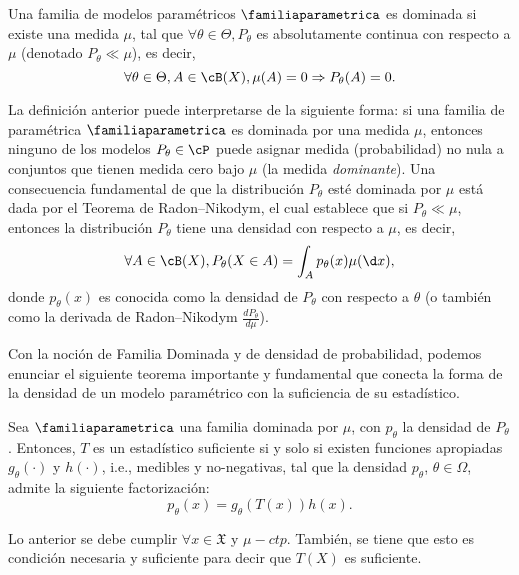 \begin{definition}
	Una familia de modelos paramétricos $\familiaparametrica$ es dominada si existe una medida $\mu$, tal que $\forall \theta\in\Theta, P_\theta$ es absolutamente continua con respecto a $\mu$ (denotado $ P_\theta \ll \mu$), es decir, 
	\begin{equation}
	\nonumber
		\forall \theta\in\Theta, A\in\cB(X), \mu(A)=0 \Rightarrow P_\theta(A) = 0.
	\end{equation}
\end{definition}

La definición anterior puede interpretarse de la siguiente forma: si una familia de paramétrica $\familiaparametrica$ es dominada por una medida $\mu$, entonces ninguno de los modelos $P_\theta\in\cP$ puede asignar medida (probabilidad) no nula a conjuntos que tienen medida cero bajo $\mu$ (la medida \textit{dominante}). Una consecuencia fundamental de que la distribución $P_\theta$ esté dominada por $\mu$ está dada por el Teorema de Radon–Nikodym,  el cual establece que si $ P_\theta \ll \mu$, entonces la distribución $P_\theta$ tiene una densidad con respecto a $\mu$, es decir,	
	\begin{equation}
	\nonumber
		\forall A\in\cB(X), P_\theta(X\in A) = \int _A p_\theta(x) \mu(\d x),
	\end{equation}
donde $p_\theta(x)$ es conocida como la densidad de $P_\theta$ con respecto a $\theta$ (o también como la derivada de Radon–Nikodym  $\frac{d P_\theta}{d \mu}$).

Con la noción de Familia Dominada y de densidad de probabilidad, podemos enunciar el siguiente teorema importante y fundamental que conecta la forma de la densidad de un modelo paramétrico con la suficiencia de su estadístico. 

\begin{theorem}
	\label{teo:neyman-fisher}
	
	Sea $\familiaparametrica$  una familia dominada por $\mu$, con $p_\theta$ la densidad de $P_\theta$. Entonces, $T$ es un estadístico suficiente si y solo si existen funciones apropiadas $g_\theta(\cdot)$ y $h(\cdot)$, i.e., medibles y no-negativas, tal que la densidad $p_\theta$, $\theta\in\Omega$, admite la siguiente factorización: 
	\begin{equation}
		\label{eq:neyman-fisher}
		p_\theta (x) = g_\theta(T(x))h(x).
	\end{equation}

    Lo anterior se debe cumplir $\forall x\in\mathfrak{X}$ y $\mu-ctp$. También, se tiene que esto es condición necesaria y suficiente para decir que $T(X)$ es suficiente.
\end{theorem}

